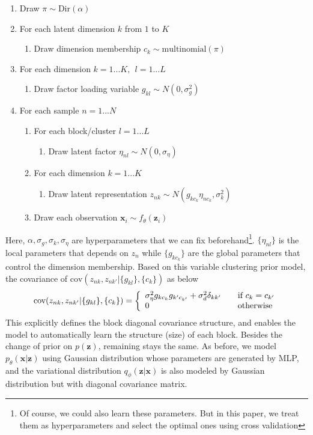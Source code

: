 \begin{enumerate}[noitemsep]
\item Draw $\pi\sim \text{Dir}(\alpha)$
\item For each latent dimension $k$ from $1$ to $K$
    \begin{enumerate}[noitemsep]
    \item Draw dimension membership $c_k\sim \text{multinomial}(\pi)$
    \end{enumerate}
\item For each dimension $k=1...K, ~~l=1...L$
    \begin{enumerate}[noitemsep]
    \item Draw factor loading variable $g_{kl}\sim N(0, \sigma_g^2)$
    \end{enumerate}
\item For each sample $n=1...N$
    \begin{enumerate}[noitemsep]
        \item For each block/cluster $l=1...L$
        \begin{enumerate}
            \item Draw latent factor $\eta_{nl}\sim N(0, \sigma_{\eta})$
        \end{enumerate}
        \item For each dimension $k=1...K$
        \begin{enumerate}
            \item Draw latent representation $z_{nk}\sim N(g_{kc_k}\eta_{nc_k}, \sigma_k^2)$
        \end{enumerate}
        \item Draw each observation $\mathbf{x}_i \sim f_{\theta}(\mathbf{z}_i)$ 
    \end{enumerate}
\end{enumerate}

Here, $\alpha, \sigma_g, \sigma_k, \sigma_{\eta}$ are hyperparameters that we can fix beforehand\footnote{Of course, we could also learn these parameters. But in this paper, we treat them as hyperparameters and select the optimal ones using cross validation}. $\{\eta_{nl}\}$ is the local parameters that depends on $z_n$ while $\{g_{kc_k}\}$ are the global parameters that control the dimension membership. Based on this variable clustering prior model, the covariance of $\text{cov}(z_{nk}, z_{nk'}|\{g_{kl}\}, \{c_k\})$ as below
\[ \text{cov}(z_{nk}, z_{nk'}|\{g_{kl}\}, \{c_k\}) = \left\{
  \begin{array}{l l}
    \sigma_{\eta}^2g_{kc_k}g_{k'c_{k'}}+\sigma_d^2\delta_{kk'} & \quad \text{if $c_k=c_{k'}$}\\
    0 & \quad \text{otherwise}
  \end{array} \right.\]
This explicitly defines the block diagonal covariance structure, and enables the model to automatically learn the structure (size) of each block.  Besides the change of prior on $p(\mathbf{z})$, remaining stays the same. As before, we model $p_{\theta}(\mathbf{x}|\mathbf{z})$ using Gaussian distribution whose parameters are generated by MLP, and the variational distribution $q_{\phi}(\mathbf{z}|\mathbf{x})$ is also modeled by Gaussian distribution but with diagonal covariance matrix. 

